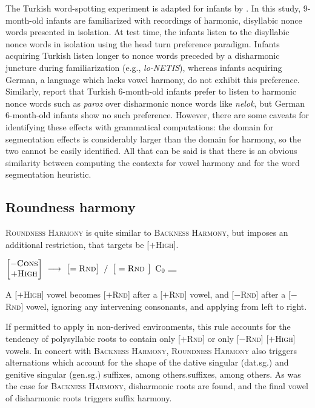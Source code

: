 The Turkish word-spotting experiment is adapted for infants by \citet{Kampen2008}.
In this study, 9-month-old infants are familiarized with recordings of harmonic, disyllabic nonce words presented in isolation.
At test time, the infants listen to the disyllabic nonce words in isolation using the head turn preference paradigm. 
Infants acquiring Turkish listen longer to nonce words preceded by a disharmonic juncture during familiarization (e.g., \emph{lo-NETIS}), whereas infants acquiring German, a language which lacks vowel harmony, do not exhibit this preference. 
Similarly, \citeauthor{Kampen2008} report that Turkish 6-month-old infants prefer to listen to harmonic nonce words such as \emph{paroz} over disharmonic nonce words like \emph{nelok}, but German 6-month-old infants show no such preference.
However, there are some caveats for identifying these effects with grammatical computations: the domain for segmentation effects is considerably larger than the domain for harmony, so the two cannot be easily identified.
All that can be said is that there is an obvious similarity between computing the contexts for vowel harmony and for the word segmentation heuristic.

\subsection{Roundness harmony}

\textsc{Roundness Harmony} is quite similar to \textsc{Backness Harmony}, but imposes an additional restriction, that targets be [$+$\textsc{High}]. 

\begin{example}
$\begin{bmatrix} -\textsc{Cons} \\ +\textsc{High} \end{bmatrix}~\goesto~\begin{bmatrix} =\textsc{Rnd} \end{bmatrix}~/~\begin{bmatrix}~=\textsc{Rnd}~\end{bmatrix}~\textrm{C}_0~\gap$
\end{example}

\noindent
A [$+$\textsc{High}] vowel becomes [$+$\textsc{Rnd}] after a [$+$\textsc{Rnd}] vowel, and [$-$\textsc{Rnd}] after a [$-$\textsc{Rnd}] vowel, ignoring any intervening consonants, and applying from left to right. 

If permitted to apply in non-derived environments, this rule accounts for the tendency of polysyllabic roots to contain only [$+$\textsc{Rnd}] or only [$-$\textsc{Rnd}] [$+$\textsc{High}] vowels.
In concert with \textsc{Backness Harmony}, \textsc{Roundness Harmony} also triggers alternations which account for the shape of the dative singular (dat.sg.) and genitive singular (gen.sg.) suffixes, among others.suffixes, among others.
As was the case for \textsc{Backness Harmony}, disharmonic roots are found, and the final vowel of disharmonic roots triggers suffix harmony.

